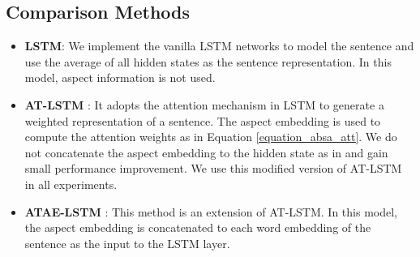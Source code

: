 \documentclass[11pt,a4paper]{article}
\begin{document}
\subsection{Comparison Methods}
\begin{itemize}
\item {\bf LSTM}: We implement the vanilla LSTM networks to model the sentence and use the average of all hidden states as the sentence representation. In this model, aspect information is not used.

\vspace{-6pt}
\item {\bf AT-LSTM} \cite{Wang2016Attention}: It adopts the attention mechanism in LSTM to generate a weighted representation of a sentence. The aspect embedding is used to compute the attention weights as in Equation \ref{equation_absa_att}. We do not concatenate the aspect embedding to the hidden state as in \cite{Wang2016Attention} and gain small performance improvement. We use this modified version of AT-LSTM in all experiments. 

\vspace{-6pt}
\item {\bf ATAE-LSTM} \cite{Wang2016Attention}: This method is an extension of AT-LSTM. In this model, the aspect embedding is concatenated to each word embedding of the sentence as the input to the LSTM layer. 

\end{itemize}
\end{document}
